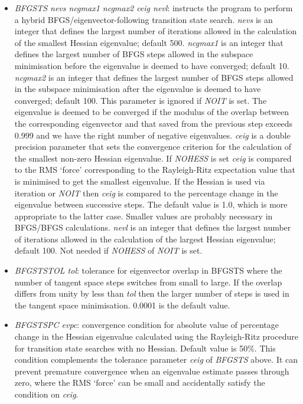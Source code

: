 \documentclass[12pt,a4paper,dvips]{article}
\begin{document}
\begin{itemize}
\item {\it BFGSTS\/ nevs ncgmax1 ncgmax2 ceig nevl}: instructs the program to perform a
hybrid BFGS/eigenvector-following transition state search.
{\it nevs\/} is an integer that defines the largest number of iterations allowed in the
calculation of the smallest Hessian eigenvalue; default 500.
{\it ncgmax1\/} is an integer that defines the largest number of BFGS steps
allowed in the subspace minimisation before the eigenvalue is deemed to have converged; default 10.
{\it ncgmax2\/} is an integer that defines the largest number of BFGS steps
allowed in the subspace minimisation after the eigenvalue is deemed to have converged; default 100.
This parameter is ignored if {\it NOIT\/} is set.
The eigenvalue is deemed to be converged if the modulus of the overlap between the corresponding
eigenvector and that saved from the previous step exceeds 0.999 and we have the right number of
negative eigenvalues.
{\it ceig\/} is a double precision parameter that sets the convergence criterion for
the calculation of the smallest non-zero Hessian eigenvalue.
If {\it NOHESS\/} is set {\it ceig\/} is compared to the RMS `force' corresponding to the
Rayleigh-Ritz expectation value that is minimised to get the smallest eigenvalue.
If the Hessian is used via iteration or {\it NOIT\/}
then {\it ceig\/} is compared to the percentage change in the eigenvalue between successive
steps. The default value is 1.0, which is more appropriate to the latter case. Smaller
values are probably necessary in BFGS/BFGS calculations.
{\it nevl\/} is an integer that defines the largest number of iterations allowed in the
calculation of the largest Hessian eigenvalue; default 100. Not needed if {\it NOHESS\/}
of {\it NOIT\/} is set. 

\item {\it BFGSTSTOL tol\/}: tolerance for eigenvector overlap in BFGSTS where the number of tangent space
steps switches from small to large. 
If the overlap differs from unity by less than {\it tol\/} then the
larger number of steps is used in the tangent space minimisation.
0.0001 is the default value.

\item {\it BFGSTSPC evpc\/}: convergence condition for absolute value of percentage
change in the Hessian eigenvalue calculated using the Rayleigh-Ritz procedure for
transition state searches with no Hessian. Default value is 50\%.
This condition complements the tolerance parameter {\it ceig\/} of
{\it BFGSTS\/} above.
It can prevent premature convergence when an eigenvalue estimate passes through
zero, where the RMS `force' can be small and accidentally satisfy the condition
on {\it ceig\/}.


\end{itemize}
\end{document}
